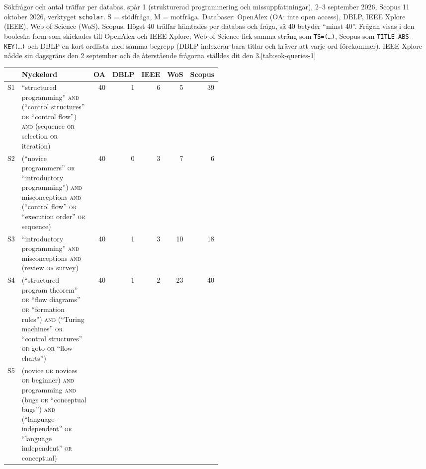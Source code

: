 \begin{table}[htbp]
  \begin{sidecaption}{Sökfrågor och antal träffar per databas, spår 1 (strukturerad programmering och missuppfattningar),
    2--3 september 2026, Scopus 11 oktober 2026, verktyget \texttt{scholar}.  S = stödfråga, M = motfråga.
    Databaser: OpenAlex (OA; inte \foreignlanguage{english}{open access}),
    DBLP, IEEE Xplore (IEEE), Web of Science (WoS), Scopus.  Högst 40
    träffar hämtades per databas och fråga, så 40 betyder \enquote{minst
    40}.  Frågan visas i den booleska form som skickades till OpenAlex
    och IEEE Xplore; Web of Science fick samma sträng som
    \texttt{TS=(\dots)}, Scopus som \texttt{TITLE-ABS-KEY(\dots)} och DBLP
    en kort ordlista med samma begrepp (DBLP indexerar bara titlar och
    kräver att varje ord förekommer).  IEEE Xplore nådde sin
    dagsgräns den 2 september och de återstående frågorna ställdes dit
    den 3.}[tab:sok-queries-1]
    \centering\footnotesize
    \begin{tabular}{@{}lp{0.5\linewidth}rrrrr@{}}
      \toprule
      & Nyckelord & OA & DBLP & IEEE & WoS & Scopus \\
      \midrule
      S1 & \enquote{structured programming} \textsc{and} (\enquote{control structures} \textsc{or} \enquote{control flow}) \textsc{and} (sequence \textsc{or} selection \textsc{or} iteration)
         & 40 & 1 & 6 & 5 & 39 \\
      S2 & (\enquote{novice programmers} \textsc{or} \enquote{introductory programming}) \textsc{and} misconceptions \textsc{and} (\enquote{control flow} \textsc{or} \enquote{execution order} \textsc{or} sequence)
         & 40 & 0 & 3 & 7 & 6 \\
      S3 & \enquote{introductory programming} \textsc{and} misconceptions \textsc{and} (review \textsc{or} survey)
         & 40 & 1 & 3 & 10 & 18 \\
      S4 & (\enquote{structured program theorem} \textsc{or} \enquote{flow diagrams} \textsc{or} \enquote{formation rules}) \textsc{and} (\enquote{Turing machines} \textsc{or} \enquote{control structures} \textsc{or} goto \textsc{or} \enquote{flow charts})
         & 40 & 1 & 2 & 23 & 40 \\
      S5 & (novice \textsc{or} novices \textsc{or} beginner) \textsc{and} programming \textsc{and} (bugs \textsc{or} \enquote{conceptual bugs}) \textsc{and} (\enquote{language-independent} \textsc{or} \enquote{language independent} \textsc{or} conceptual)

\end{tabular}
\end{sidecaption}
\end{table}
